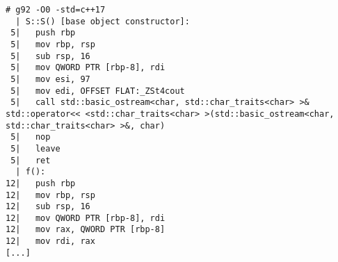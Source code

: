 \begin{lstlisting}[language={},numbers=none,title=\href{https://godbolt.org/z/i_g1LW}{\texttt{godbolt.org/z/i\_g1LW}}]
# g92 -O0 -std=c++17
  | S::S() [base object constructor]:
 5|   push rbp
 5|   mov rbp, rsp
 5|   sub rsp, 16
 5|   mov QWORD PTR [rbp-8], rdi
 5|   mov esi, 97
 5|   mov edi, OFFSET FLAT:_ZSt4cout
 5|   call std::basic_ostream<char, std::char_traits<char> >& std::operator<< <std::char_traits<char> >(std::basic_ostream<char, std::char_traits<char> >&, char)
 5|   nop
 5|   leave
 5|   ret
  | f():
12|   push rbp
12|   mov rbp, rsp
12|   sub rsp, 16
12|   mov QWORD PTR [rbp-8], rdi
12|   mov rax, QWORD PTR [rbp-8]
12|   mov rdi, rax
[...]
\end{lstlisting}
